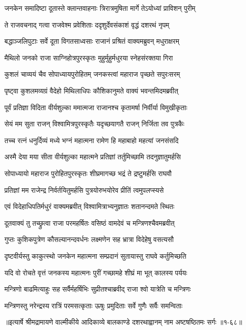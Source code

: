 
\twolineshloka
{जनकेन समादिष्टा दूतास्ते क्लान्तवाहनाः}
{त्रिरात्रमुषिता मार्गे तेऽयोध्यां प्राविशन् पुरीम्} %

\twolineshloka
{ते राजवचनाद् गत्वा राजवेश्म प्रवेशिताः}
{ददृशुर्देवसंकाशं वृद्धं दशरथं नृपम्} %

\twolineshloka
{बद्धाञ्जलिपुटाः सर्वे दूता विगतसाध्वसाः}
{राजानं प्रश्रितं वाक्यमब्रुवन् मधुराक्षरम्} %

\twolineshloka
{मैथिलो जनको राजा साग्निहोत्रपुरस्कृतः}
{मुहुर्मुहुर्मधुरया स्नेहसंरक्तया गिरा} %

\twolineshloka
{कुशलं चाव्ययं चैव सोपाध्यायपुरोहितम्}
{जनकस्त्वां महाराज पृच्छते सपुरःसरम्} %

\twolineshloka
{पृष्ट्वा कुशलमव्यग्रं वैदेहो मिथिलाधिपः}
{कौशिकानुमते वाक्यं भवन्तमिदमब्रवीत्} %

\twolineshloka
{पूर्वं प्रतिज्ञा विदिता वीर्यशुल्का ममात्मजा}
{राजानश्च कृतामर्षा निर्वीर्या विमुखीकृताः} %

\twolineshloka
{सेयं मम सुता राजन् विश्वामित्रपुरस्कृतैः}
{यदृच्छयागतै राजन् निर्जिता तव पुत्रकैः} %

\twolineshloka
{तच्च रत्नं धनुर्दिव्यं मध्ये भग्नं महात्मना}
{रामेण हि महाबाहो महत्यां जनसंसदि} %

\twolineshloka
{अस्मै देया मया सीता वीर्यशुल्का महात्मने}
{प्रतिज्ञां तर्तुमिच्छामि तदनुज्ञातुमर्हसि} %

\twolineshloka
{सोपाध्यायो महाराज पुरोहितपुरस्कृतः}
{शीघ्रमागच्छ भद्रं ते द्रष्टुमर्हसि राघवौ} %

\twolineshloka
{प्रतिज्ञां मम राजेन्द्र निर्वर्तयितुमर्हसि}
{पुत्रयोरुभयोरेव प्रीतिं त्वमुपलप्स्यसे} %

\twolineshloka
{एवं विदेहाधिपतिर्मधुरं वाक्यमब्रवीत्}
{विश्वामित्राभ्यनुज्ञातः शतानन्दमते स्थितः} %

\twolineshloka
{दूतवाक्यं तु तच्छ्रुत्वा राजा परमहर्षितः}
{वसिष्ठं वामदेवं च मन्त्रिणश्चैवमब्रवीत्} %

\twolineshloka
{गुप्तः कुशिकपुत्रेण कौसल्यानन्दवर्धनः}
{लक्ष्मणेन सह भ्रात्रा विदेहेषु वसत्यसौ} %

\twolineshloka
{दृष्टवीर्यस्तु काकुत्स्थो जनकेन महात्मना}
{सम्प्रदानं सुतायास्तु राघवे कर्तुमिच्छति} %

\twolineshloka
{यदि वो रोचते वृत्तं जनकस्य महात्मनः}
{पुरीं गच्छामहे शीघ्रं मा भूत् कालस्य पर्ययः} %

\twolineshloka
{मन्त्रिणो बाढमित्याहुः सह सर्वैर्महर्षिभिः}
{सुप्रीतश्चाब्रवीद् राजा श्वो यात्रेति च मन्त्रिणः} %

\twolineshloka
{मन्त्रिणस्तु नरेन्द्रस्य रात्रिं परमसत्कृताः}
{ऊषुः प्रमुदिताः सर्वे गुणैः सर्वैः समन्विताः} %


॥इत्यार्षे श्रीमद्रामायणे वाल्मीकीये आदिकाव्ये बालकाण्डे दशरथाह्वानम् नाम अष्टषष्ठितमः सर्गः ॥१-६८॥
